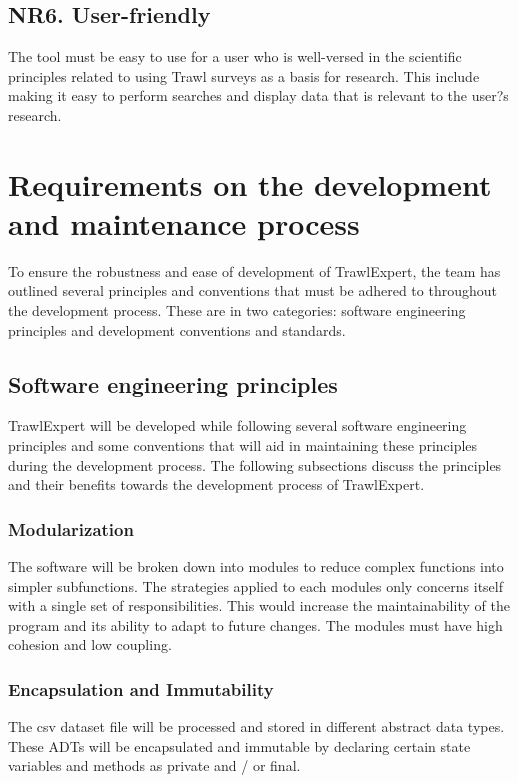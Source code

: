 \documentclass{article}
\begin{document}
\subsection{NR6. User-friendly}
The tool must be easy to use for a user who is well-versed in the scientific principles related to using Trawl surveys as a basis for research. This include making it easy to perform searches and display data that is relevant to the user?s research.

\section{Requirements on the development and maintenance process}
To ensure the robustness and ease of development of TrawlExpert, the team has outlined several principles and conventions that must be adhered to throughout the development process. These are in two categories: software engineering principles and development conventions and standards.

\subsection{Software engineering principles}
TrawlExpert will be developed while following several software engineering principles and some conventions that will aid in maintaining these principles during the development process. The following subsections discuss the principles and their benefits towards the development process of TrawlExpert.

\subsubsection{Modularization}
The software will be broken down into modules to reduce complex functions into simpler subfunctions. The strategies applied to each modules only concerns itself with a single set of responsibilities. This would increase the maintainability of the program and its ability to adapt to future changes. The modules must have high cohesion and low coupling. 

\subsubsection{Encapsulation and Immutability}
The csv dataset file will be processed and stored in different abstract data types. These ADTs will be encapsulated and immutable by declaring certain state variables and methods as private and / or final.
\end{document}
